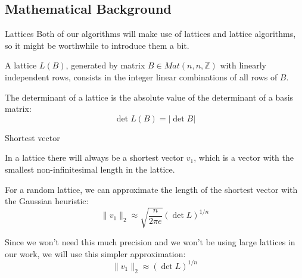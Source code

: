 \documentclass[usepdftitle=false]{beamer}
\begin{document}
\subsection{Mathematical Background}
\begin{frame}{Lattices}
Both of our algorithms will make use of lattices and lattice algorithms, so it might be
worthwhile to introduce them a bit.

\begin{definition}
    A lattice $L(B)$, generated by matrix $B\in Mat(n, n, \mathbb{Z})$ with linearly independent
    rows, consists in the integer linear combinations of all rows of $B$.
\end{definition}
\begin{definition}
    The determinant of a lattice is the absolute value of the determinant of a basis matrix:
    \begin{equation}
    \det L(B) = |\det B|
    \end{equation}
\end{definition}
\end{frame}
\begin{frame}{Shortest vector}
\begin{definition}
    In a lattice there will always be a shortest vector $v_1$, which is a vector with the smallest
    non-infinitesimal length in the lattice.
\end{definition}

For a random lattice, we can approximate the length of the shortest vector with the Gaussian
heuristic:
\begin{equation}
\|v_1\|_2 \approx \sqrt{\frac{n}{2 \pi e}}(\det L)^{1/n}
\end{equation}

Since we won't need this much precision and we won't be using large lattices in our work, we will
use this simpler approximation:
\begin{equation}
\|v_1\|_2 \approx (\det L)^{1/n}\label{shortest_vector_len_approx}
\end{equation}
\end{frame}
\end{document}
